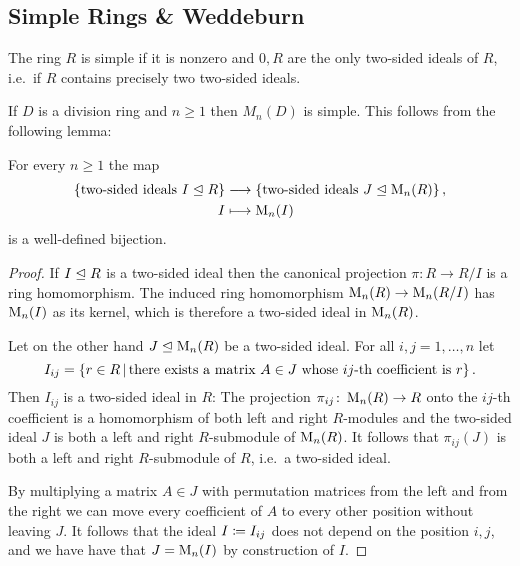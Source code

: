 \subsection{Simple Rings \& Weddeburn}


\begin{definition}
  The ring $R$ is simple if it is nonzero and $0, R$ are the only two-sided ideals of $R$, i.e.\ if $R$ contains precisely two two-sided ideals.
\end{definition}


\begin{example}
  \label{example: matrix algebra over skew field is simple}
  If $D$ is a division ring and $n \geq 1$ then $M_n(D)$ is simple.
  This follows from the following lemma:
\end{example}


\begin{lemma}
  For every $n \geq 1$ the map
  \begin{align*}
              \{ \text{two-sided ideals $I \trianglelefteq R$} \}
    &\longrightarrow  \{ \text{two-sided ideals $J \trianglelefteq \operatorname{M}_n(R)$} \} \,,
    \\
                  I
    &\longmapsto  \operatorname{M}_n(I)
  \end{align*}
  is a well-defined bijection.
\end{lemma}


\begin{proof}
  If $I \trianglelefteq R$ is a two-sided ideal then the canonical projection $\pi \colon R \to R/I$ is a ring homomorphism.
  The induced ring homomorphism $\operatorname{M}_n(R) \to \operatorname{M}_n(R/I)$ has $\operatorname{M}_n(I)$ as its kernel, which is therefore a two-sided ideal in $\operatorname{M}_n(R)$.
  
  Let on the other hand $J \trianglelefteq \operatorname{M}_n(R)$ be a two-sided ideal.
  For all $i, j = 1, \dotsc, n$ let
  \[
      I_{ij}
    = \{
        r \in R
      \suchthat
        \text{there exists a matrix $A \in J$ whose $ij$-th coefficient is $r$}
      \} \,.
  \]
  Then $I_{ij}$ is a two-sided ideal in $R$:
  The projection $\pi_{ij} \colon \operatorname{M}_n(R) \to R$ onto the $ij$-th coefficient is a homomorphism of both left and right $R$-modules and the two-sided ideal $J$ is both a left and right $R$-submodule of $\operatorname{M}_n(R)$.
  It follows that $\pi_{ij}(J)$ is both a left and right $R$-submodule of $R$, i.e.\ a two-sided ideal.
  
  By multiplying a matrix $A \in J$ with permutation matrices from the left and from the right we can move every coefficient of $A$ to every other position without leaving $J$.
  It follows that the ideal $I \coloneqq I_{ij}$ does not depend on the position $i,j$, and we have have that $J = \operatorname{M}_n(I)$ by construction of $I$.
\end{proof}



